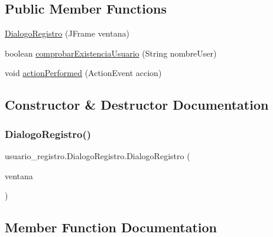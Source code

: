 \subsection*{Public Member Functions}
\begin{DoxyCompactItemize}
\item 
\mbox{\hyperlink{classusuario__registro_1_1_dialogo_registro_a00b1a313d3a3151b11e094023b38151d}{Dialogo\+Registro}} (J\+Frame ventana)
\item 
boolean \mbox{\hyperlink{classusuario__registro_1_1_dialogo_registro_adabbf8a1002c48f738597b2fb49b3b93}{comprobar\+Existencia\+Usuario}} (String nombre\+User)
\item 
void \mbox{\hyperlink{classusuario__registro_1_1_dialogo_registro_ac58a93d4081080e284d820523317aa58}{action\+Performed}} (Action\+Event accion)
\end{DoxyCompactItemize}


\subsection{Constructor \& Destructor Documentation}
\mbox{\label{classusuario__registro_1_1_dialogo_registro_a00b1a313d3a3151b11e094023b38151d}} 
\subsubsection{\texorpdfstring{Dialogo\+Registro()}{DialogoRegistro()}}
{\footnotesize\ttfamily usuario\+\_\+registro.\+Dialogo\+Registro.\+Dialogo\+Registro (\begin{DoxyParamCaption}\item[{J\+Frame}]{ventana }\end{DoxyParamCaption})}



\subsection{Member Function Documentation}
\mbox{\label{classusuario__registro_1_1_dialogo_registro_ac58a93d4081080e284d820523317aa58}} 
